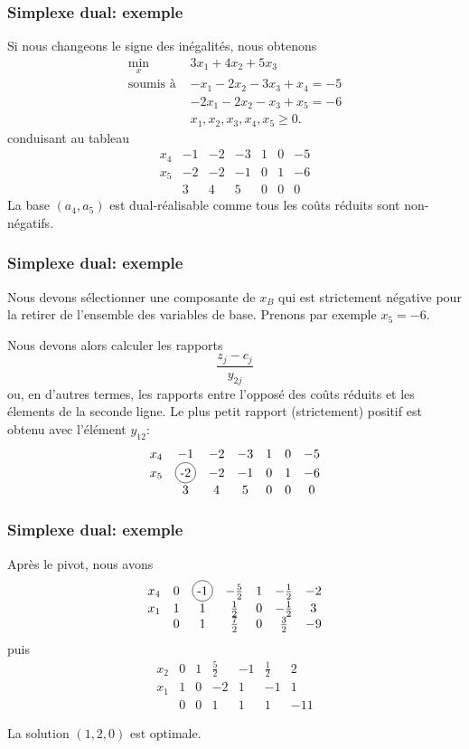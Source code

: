 \documentclass[usepdftitle=false]{beamer}
\newcommand*\circled[1]{\tikz[baseline=(char.base)]{
    \node[shape=circle,draw,inner sep=2pt] (char) {#1};}}
\begin{document}
\begin{frame}
	\frametitle{Simplexe dual: exemple}
	
	Si nous changeons le signe des inégalités, nous obtenons
	\begin{align*}
		\min_x \ & 3x_1 + 4x_2 + 5x_3 \\
		\mbox{soumis à } & -x_1 - 2x_2 - 3x_3 + x_4 = -5 \\
		& -2x_1 - 2x_2 - x_3 + x_5 = -6 \\
		& x_1, x_2, x_3, x_4, x_5 \geq 0.
	\end{align*}
	conduisant au tableau
	\[
	\begin{matrix}
		x_4 & -1 & -2 & -3 & 1 & 0 & -5 \\
		x_5 & -2 & -2 & -1 & 0 & 1 & -6 \\
		& 3 & 4 & 5 & 0 & 0 & 0
	\end{matrix}
	\]
	La base $(a_4, a_5)$ est dual-réalisable comme tous les coûts réduits sont non-négatifs.
	
\end{frame}

\begin{frame}
	\frametitle{Simplexe dual: exemple}
	
	Nous devons sélectionner une composante de $x_B$ qui est strictement négative pour la retirer de l'ensemble des variables de base.
	Prenons par exemple $x_5 = -6$.
	
	\mbox{}
	
	Nous devons alors calculer les rapports
	\[
	\frac{z_j - c_j}{y_{2j}}
	\]
	ou, en d'autres termes, les rapports entre l'opposé des coûts réduits et les élements de la seconde ligne.
	Le plus petit rapport (strictement) positif est obtenu avec l'élément $y_{12}$:
	\[
	\begin{matrix}
		x_4 & -1 & -2 & -3 & 1 & 0 & -5 \\
		x_5 & \circled{-2} & -2 & -1 & 0 & 1 & -6 \\
		& 3 & 4 & 5 & 0 & 0 & 0
	\end{matrix}
	\]
	
\end{frame}

\begin{frame}
	\frametitle{Simplexe dual: exemple}
	
	Après le pivot, nous avons
	\[
	\begin{matrix}
		x_4 & 0 & \circled{-1} & -\frac{5}{2} & 1 & -\frac{1}{2} & -2 \\
		x_1 & 1 & 1 & \frac{1}{2} & 0 & -\frac{1}{2} & 3 \\
		& 0 & 1 & \frac{7}{2} & 0 & \frac{3}{2} & -9
	\end{matrix}
	\]
	puis
	\[
	\begin{matrix}
		x_2 & 0 & 1 & \frac{5}{2} & -1 & \frac{1}{2} & 2 \\
		x_1 & 1 & 0 & -2 & 1 & -1 & 1 \\
		& 0 & 0 & 1 & 1 & 1 & -11
	\end{matrix}
	\]
	
	\mbox{}
	
	La solution $(1, 2, 0)$ est optimale.
	
\end{frame}
\end{document}
